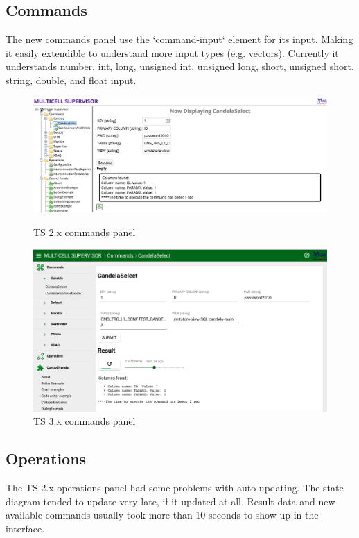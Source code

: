 \subsection{Commands}
The new commands panel use the `command-input` element for its input. Making it
easily extendible to understand more input types (e.g. vectors).
Currently it understands number, int, long, unsigned int, unsigned long, short,
unsigned short, string, double, and float input.
\begin{figure}[H]
  \centering
  \includegraphics[width=\textwidth]{images/ts2_commands}
  \caption{TS 2.x commands panel}
  \label{fig:ts2_commands}
  \centering
  \includegraphics[width=\textwidth]{images/ts3_commands}
  \caption{TS 3.x commands panel}
  \label{fig:ts3_commands}
\end{figure}

\subsection{Operations}
The TS 2.x operations panel had some problems with auto-updating.
The state diagram tended to update very late, if it updated at all.
Result data and new available commands usually took more than 10 seconds to
show up in the interface.

